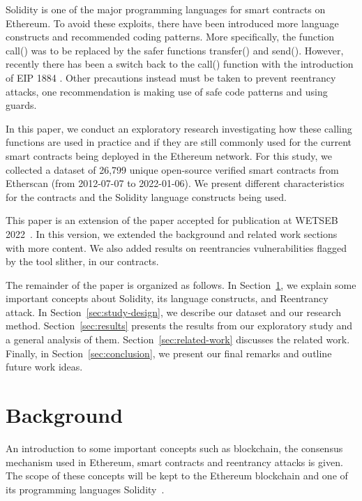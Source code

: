 \documentclass[10pt,conference]{IEEEtran}
\newcommand{\totalContracts}{26,799\xspace}
\begin{document}
Solidity is one of the major programming languages for smart contracts on Ethereum. To avoid these exploits, there have been introduced more language constructs and recommended coding patterns. More specifically, the function call() was to be replaced by the safer functions transfer() and send(). However, recently there has been a switch back to the call() function with the introduction of EIP 1884 \cite{eip1884}. Other precautions instead must be taken to prevent reentrancy attacks, one recommendation is making use of safe code patterns and using guards.

In this paper, we conduct an exploratory research investigating how these calling functions are used in practice and if they are still commonly used for the current smart contracts being deployed in the Ethereum network. For this study, we collected a dataset of \totalContracts unique open-source verified smart contracts from Etherscan (from 2012-07-07 to 2022-01-06). We present different characteristics for the contracts and the Solidity language constructs being used.

This paper is an extension of the paper accepted for publication at WETSEB 2022~\cite{darin2022}. In this version, we extended the background and related work sections with more content. We also added results on reentrancies vulnerabilities flagged by the tool slither, in our contracts. 

The remainder of the paper is organized as follows. In Section~\ref{sec:background}, we explain some important concepts about Solidity, its language constructs, and Reentrancy attack. In Section~\ref{sec:study-design}, we describe our dataset and our research method. Section~\ref{sec:results} presents the results from our exploratory study and a general analysis of them. Section~\ref{sec:related-work} discusses the related work. Finally, in Section~\ref{sec:conclusion}, we present our final remarks and outline future work ideas.



\section{Background}\label{sec:background}
An introduction to some important concepts such as blockchain, the consensus mechanism used in Ethereum, smart contracts and reentrancy attacks is given. The scope of these concepts will be kept to the Ethereum blockchain and one of its programming languages Solidity~\cite{solidity}.
\end{document}
